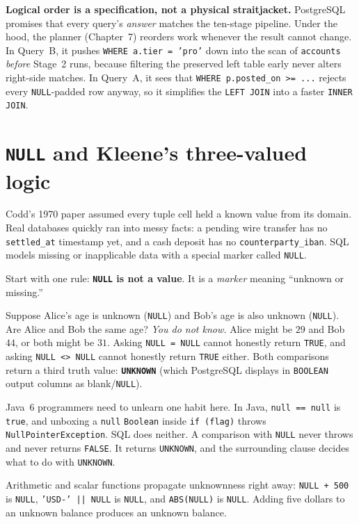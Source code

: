 \begin{intuitionbox}
\textbf{Logical order is a specification, not a physical straitjacket.} PostgreSQL promises that every query's \emph{answer} matches the ten-stage pipeline. Under the hood, the planner (Chapter~7) reorders work whenever the result cannot change. In Query~B, it pushes \texttt{WHERE a.tier = 'pro'} down into the scan of \texttt{accounts} \emph{before} Stage~2 runs, because filtering the preserved left table early never alters right-side matches. In Query~A, it sees that \texttt{WHERE p.posted\_on >= ...} rejects every \texttt{NULL}-padded row anyway, so it simplifies the \texttt{LEFT JOIN} into a faster \texttt{INNER JOIN}.
\end{intuitionbox}

\section{\texttt{NULL} and Kleene's three-valued logic}
\label{sec:ch01-null-3vl}

Codd's 1970 paper assumed every tuple cell held a known value from its domain. Real databases quickly ran into messy facts: a pending wire transfer has no \texttt{settled\_at} timestamp yet, and a cash deposit has no \texttt{counterparty\_iban}. SQL models missing or inapplicable data with a special marker called \texttt{NULL}.

Start with one rule: \textbf{\texttt{NULL} is not a value}. It is a \emph{marker} meaning ``unknown or missing.''

Suppose Alice's age is unknown (\texttt{NULL}) and Bob's age is also unknown (\texttt{NULL}). Are Alice and Bob the same age? \emph{You do not know.} Alice might be $29$ and Bob $44$, or both might be $31$. Asking \texttt{NULL = NULL} cannot honestly return \texttt{TRUE}, and asking \texttt{NULL <> NULL} cannot honestly return \texttt{TRUE} either. Both comparisons return a third truth value: \textbf{\texttt{UNKNOWN}} (which PostgreSQL displays in \texttt{BOOLEAN} output columns as blank/\texttt{NULL}).

Java~6 programmers need to unlearn one habit here. In Java, \texttt{null == null} is \texttt{true}, and unboxing a \texttt{null} \texttt{Boolean} inside \texttt{if (flag)} throws \texttt{NullPointerException}. SQL does neither. A comparison with \texttt{NULL} never throws and never returns \texttt{FALSE}. It returns \texttt{UNKNOWN}, and the surrounding clause decides what to do with \texttt{UNKNOWN}.

Arithmetic and scalar functions propagate unknownness right away: \texttt{NULL + 500} is \texttt{NULL}, \texttt{'USD-' || NULL} is \texttt{NULL}, and \texttt{ABS(NULL)} is \texttt{NULL}. Adding five dollars to an unknown balance produces an unknown balance.

